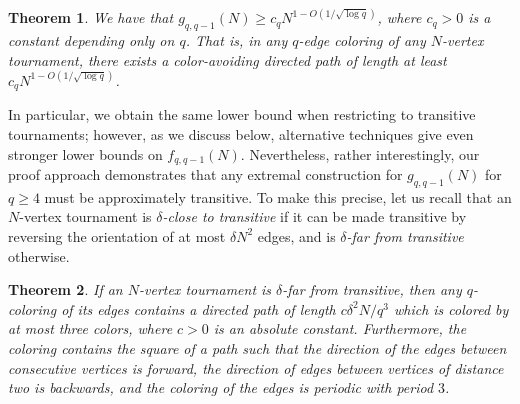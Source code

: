 \documentclass[11pt,reqno]{amsart}
\newtheorem{theorem}{Theorem}[section]
\theoremstyle{definition}
\newcommand\1{\mathbf{1}}
\let\geq\geqslant
\begin{document}
\begin{theorem}\label{thm:main}
    We have that $g_{q,q-1}(N) \geq c_q N^{1-O(1/\sqrt{\log q})}$, where $c_q >0$ is a constant depending only on $q$.
    That is, in any $q$-edge coloring of any $N$-vertex tournament, there exists a color-avoiding directed path of length at least $c_q N^{1-O(1/\sqrt{\log q})}$.
\end{theorem}


In particular, we obtain the same lower bound when restricting to transitive tournaments; however, as we discuss below, alternative techniques give even stronger lower bounds on $f_{q,q-1}(N)$. Nevertheless, rather interestingly, our proof approach demonstrates that any extremal construction for $g_{q,q-1}(N)$ for $q \geq 4$ must be approximately transitive.
To make this precise, let us recall that an $N$-vertex tournament is \emph{$\delta$-close to transitive} if it can be made transitive by reversing the orientation of at most $\delta N^2$ edges, and is \emph{$\delta$-far from transitive} otherwise.
\begin{theorem}\label{labelfarfromtransitive}
    If an $N$-vertex tournament is $\delta$-far from transitive, then any $q$-coloring of its edges contains a directed path of length $c\delta^2 N/q^3$ which is colored by at most three colors, where $c>0$ is an absolute constant. Furthermore, the coloring contains the square of a path such that the direction of the edges between consecutive vertices is forward, the direction of edges between vertices of distance two is backwards, and the coloring of the edges is periodic with period $3$. 
\end{theorem}
\begin{center}
\end{center}
\end{document}
